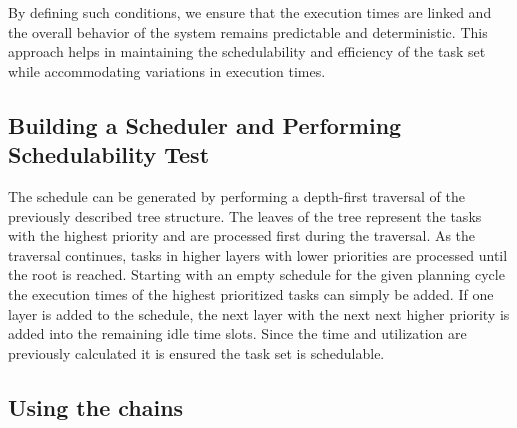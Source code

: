 By defining such conditions, we ensure that the execution times are linked and the overall behavior of the system remains predictable and deterministic. 
This approach helps in maintaining the schedulability and efficiency of the task set while accommodating variations in execution times.

\subsection{Building a Scheduler and Performing Schedulability Test}\label{sec:concept_scheduler}
The schedule can be generated by performing a depth-first traversal of the previously described tree structure.
The leaves of the tree represent the tasks with the highest priority and are processed first during the traversal.
As the traversal continues, tasks in higher layers with lower priorities are processed until the root is reached.
Starting with an empty schedule for the given planning cycle the execution times of the highest prioritized tasks can simply be added.
If one layer is added to the schedule, the next layer with the next next higher priority is added into the remaining idle time slots.
Since the time and utilization are previously calculated it is ensured the task set is schedulable.

\subsection{Using the chains}\label{sec:chains}
\todo{!!}
